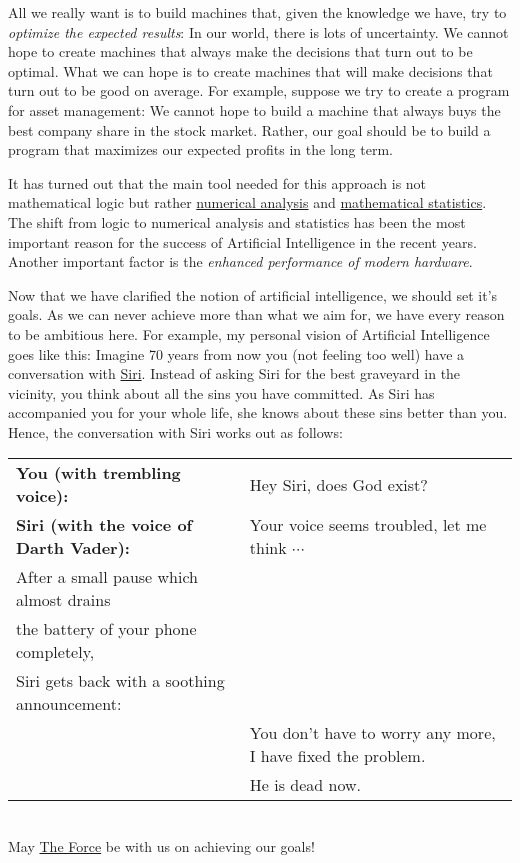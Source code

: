 \begin{enumerate}
      All we really want is to build machines that, given the knowledge we have, try to 
      \emph{\color{blue}optimize the expected results}:  In our world, there is lots of uncertainty.  We cannot
      hope to create 
      machines that always make the decisions that turn out to be optimal.  What we can
      hope is to create machines that will make decisions that turn out to be good on average.  For
      example, suppose we try to create a program for asset management:  We cannot hope to build a
      machine that always buys the best company share in the stock market.  Rather, our goal should
      be to build a program that maximizes our expected profits in the long term.

      It has turned out that the main tool needed for this approach is not mathematical logic but
      rather \href{https://en.wikipedia.org/wiki/Numerical_analysis}{numerical analysis} and
      \href{https://en.wikipedia.org/wiki/Mathematical_statistics}{mathematical statistics}.  The shift 
      from logic to numerical analysis and statistics has been the most important reason for the success of
      Artificial Intelligence in the recent years.  Another important factor is the 
      \emph{\color{blue}enhanced performance of modern hardware}. 
\end{enumerate}
Now that we have clarified the notion of artificial intelligence, we should set it's goals.  As we
can never achieve more than what we aim for, we have every reason to be ambitious here.  For example, my
personal vision of Artificial Intelligence goes like this: 
Imagine 70 years from now you (not feeling too well) have a conversation with
\href{https://en.wikipedia.org/wiki/Siri}{Siri}.  Instead of asking Siri for the
best graveyard in the vicinity, you think about all the sins you have committed.  As Siri has
accompanied you for your whole life, she knows about these sins better than you.  Hence,  
the conversation with Siri works out as follows: 
\\[0.2cm]
\begin{tabular}[t]{ll}
\textbf{You (with trembling voice):}           & Hey Siri, does God exist?                   \\[0.2cm]
\textbf{Siri (with the voice of Darth Vader):} & Your voice seems troubled, let me think $\cdots$ \\
After a small pause which almost drains \\
the battery of your phone completely, \\
Siri gets back with a soothing announcement: \\           
                                     & You don't have to worry any more, I have fixed the problem.  \\
                                     & He is dead now.  
\end{tabular}
\\[0.2cm]
May \href{https://en.wikipedia.org/wiki/The_Force_(Star_Wars)}{The Force} be with us on achieving our goals!
\pagebreak

